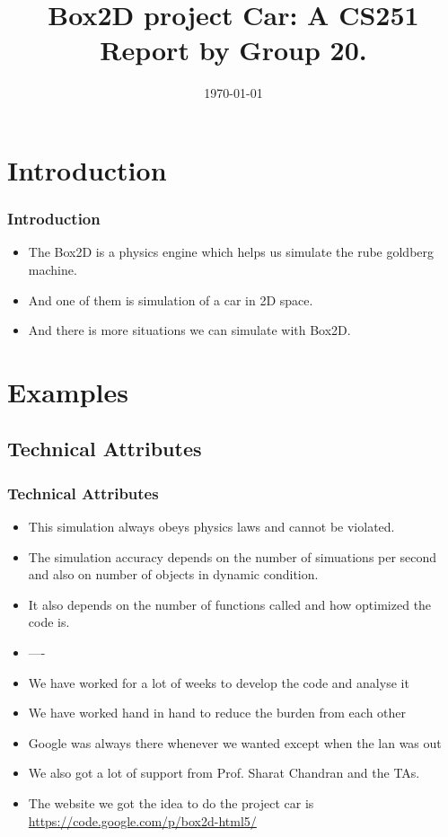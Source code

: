 \documentclass{beamer}
\author[Abhinav \& Surya \& Rishabh]
{%
   \texorpdfstring{
        \begin{columns}
            \column{.4\linewidth}
            \centering
            Abhinav\\
            {140050054}\\
            {abhinavrondi11296@gmail.com}
            \column{.4\linewidth}
            \centering
            Surya\\
            {140050055}\\
            {suri892010@gmail.com}
            \column{.33\linewidth}
            \centering
            Rishabh\\
            {140050061}\\
            {rishabh6417@gmail.com}
        \end{columns}
   }
   {John Doe \& Jane Doe}
}
\title{Box2D project Car: A CS251 Report by Group 20.}
\date{\today}
\begin{document}
\begin{frame}
\titlepage
\end{frame}
\section{Introduction}
\begin{frame}
\frametitle{Introduction}
\begin{itemize}
\item The Box2D is a physics engine which helps us simulate the rube goldberg machine.
\item And one of them is simulation of a car in 2D space.
\item And there is more situations we can simulate with Box2D.
\end{itemize}
\end{frame}
\section{Examples}
\subsection{Technical Attributes}
\begin{frame}
\frametitle{Technical Attributes}
\begin{itemize}
\item This simulation always obeys physics laws and cannot be violated.
\item The simulation accuracy depends on the number of simuations per second and also on number of objects in dynamic condition.
\item It also depends on the number of functions called and how optimized the code is.
\end{itemize}
\end{frame}
\begin{frame}
\begin{itemize}
\frametitle{Challenges faced }
\item ----
\end{itemize}
\end{frame}
\begin{frame}
\begin{itemize}
\frametitle{Efforts }
\item We have worked for a lot of weeks to develop the code and analyse it
\item We have worked hand in hand to reduce the burden from each other
\end{itemize}
\end{frame}
\begin{frame}
\begin{itemize}
\frametitle{Acknowledgements }
\item Google was always there whenever we wanted except when the lan was out
\item We also got a lot of support from Prof. Sharat Chandran and the TAs.
\item The website we got the idea to do the project car is \url{https://code.google.com/p/box2d-html5/}
\end{itemize}
\end{frame}
\end{document}
